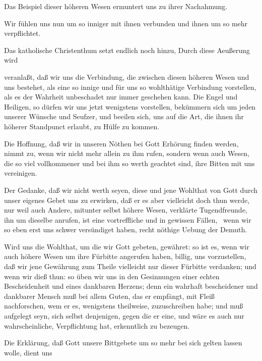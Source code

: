 \begin{aufza}
\begin{aufzb}
\item Das Beispiel dieser höheren Wesen ermuntert uns zu ihrer Nachahmung.
\item Wir fühlen uns nun um so inniger mit ihnen verbunden und ihnen um so mehr verpflichtet.
\end{aufzb}
\item Das katholische Christenthum setzt endlich noch hinzu,  Durch diese Aeußerung wird
\begin{aufzb}
\item veranlaßt, daß wir uns die Verbindung, die zwischen diesen höheren Wesen und uns bestehet, als eine so innige und für uns so wohlthätige Verbindung vorstellen, als es der Wahrheit unbeschadet nur immer geschehen kann. Die Engel und Heiligen, so dürfen wir uns jetzt wenigstens vorstellen, bekümmern sich um jeden unserer Wünsche und Seufzer, und beeilen sich, uns auf die Art, die ihnen ihr höherer Standpunct erlaubt, zu Hülfe zu kommen.
\item Die Hoffnung, daß wir in unseren Nöthen bei Gott Erhörung finden werden, nimmt zu, wenn wir nicht mehr allein zu ihm rufen, sondern wenn auch Wesen, die so viel vollkommener und bei ihm so werth geachtet sind, ihre Bitten mit uns vereinigen.~
\item Der Gedanke, daß wir nicht werth seyen, diese und jene Wohlthat von Gott durch unser eigenes Gebet uns zu erwirken, daß er es aber vielleicht doch thun werde, nur weil auch Andere, mitunter selbst höhere Wesen, verklärte Tugendfreunde, ihn um dieselbe anrufen, ist eine vortreffliche und in gewissen Fällen, \zB\ wenn wir so eben erst uns schwer versündiget haben, recht nöthige Uebung der Demuth.
\item Wird uns die Wohlthat, um die wir Gott gebeten, gewähret: so ist es, wenn wir auch höhere Wesen um ihre Fürbitte angerufen haben, billig, uns vorzustellen, daß wir jene Gewährung zum Theile vielleicht nur dieser Fürbitte verdanken; und wenn wir dieß thun: so üben wir uns in den Gesinnungen einer echten Bescheidenheit und eines dankbaren Herzens; denn ein wahrhaft bescheidener und dankbarer Mensch muß bei allem Guten, das er empfängt, mit Fleiß nachforschen, wem er es, wenigstens theilweise, zuzuschreiben habe; und muß aufgelegt seyn, sich selbst denjenigen, gegen die er eine, und wäre es auch nur wahrscheinliche, Verpflichtung hat, erkenntlich zu bezeugen.
\end{aufzb}
\item Die Erklärung, daß Gott unsere Bittgebete um so mehr bei sich gelten lassen wolle,  dient uns

\end{aufza}
